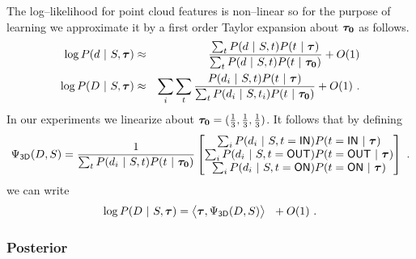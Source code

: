 The log--likelihood for point cloud features  is
non--linear so for the purpose of learning we approximate it by a
first order Taylor expansion about $\IndModelo$ as follows.
\begin{eqnarray}
  \log P(\Depth~|~\Seam,\IndModel)
  &\approx&
  \frac
      {\sum_{\Ind} P(\Depth~|~\Seam,\Ind) P(\Ind~|~\IndModel)}
      {\sum_{\Ind} P(\Depth~|~\Seam,\Ind) P(\Ind~|~\IndModelo)} + O(1)\\
  \log P(\Depths~|~\Seam,\IndModel)
  &\approx&
  \sum_i \sum_{\Ind} \frac
      {P(\Depth_i~|~\Seam,\Ind) P(\Ind~|~\IndModel)}
      {\sum_{\Ind} P(\Depth_i~|~\Seam,\Ind_i) P(\Ind~|~\IndModelo)} + O(1) ~.
\end{eqnarray}
In our experiments we linearize about
$\IndModelo=(\frac{1}{3},\frac{1}{3},\frac{1}{3})$. It follows that by
defining
\begin{equation}
  \JointFtr_{\textsf{3D}}(\Depths,\Seam) =
  \frac{1}{\sum_{\Ind} P(\Depth_i~|~\Seam,\Ind) P(\Ind~|~\IndModelo)}
  \begin{bmatrix}
    \sum_i P(\Depth_i~|~\Seam,\Ind=\IN) P(\Ind=\IN~|~\IndModel) \\
    \sum_i P(\Depth_i~|~\Seam,\Ind=\OUT) P(\Ind=\OUT~|~\IndModel) \\
    \sum_i P(\Depth_i~|~\Seam,\Ind=\ON) P(\Ind=\ON~|~\IndModel)
  \end{bmatrix}~.
\end{equation}
we can write
\begin{equation}
  \label{eq:linear-pt-model}
  \log P(\Depths~|~\Seam,\IndModel)
  =
  \bigl\langle
    \IndModel, \JointFtr_{\textsf{3D}}(\Depths,\Seam)
  \bigr\rangle ~~ + O(1) ~.
\end{equation}

\subsubsection{Posterior}

